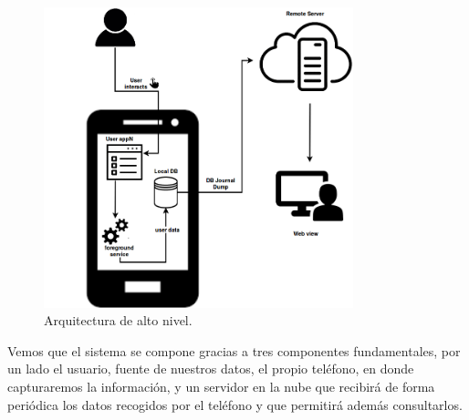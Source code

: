 \documentclass[12pt,a4paper,oneside]{book} %
\begin{document}

\begin{figure}[H]
  \begin{center}
     \includegraphics[width=0.8\textwidth]{pictures/architecture/highLevel/altonivel01.png}
  \end{center}
  \caption[Arquitectura de alto nivel]{Arquitectura de alto nivel.}
  \label{fig:LandscapeFigure}
\end{figure}

\newpage
Vemos que el sistema se compone gracias a tres componentes fundamentales, por un lado el usuario, fuente de nuestros datos, el propio teléfono, en donde capturaremos la información, y un servidor en la nube que recibirá de forma periódica los datos recogidos por el teléfono y que permitirá además consultarlos. 
\newline
\newline
\end{document}
